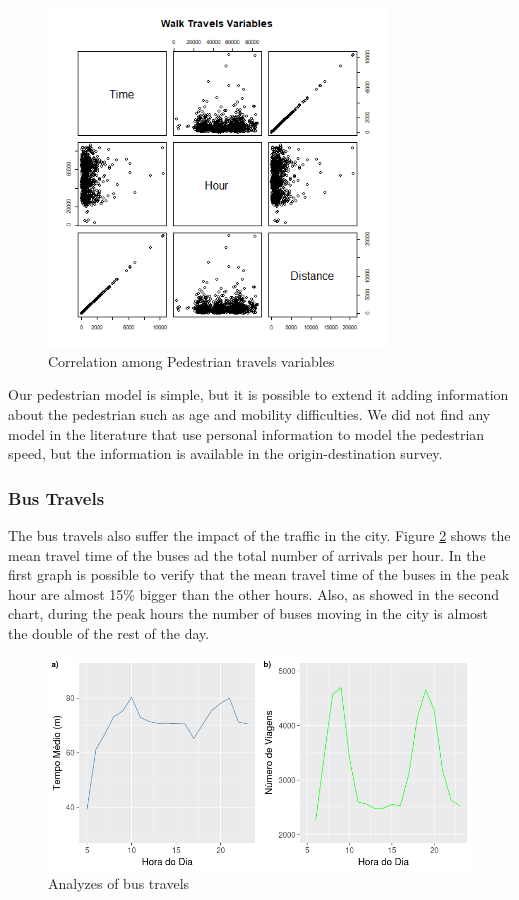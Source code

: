 \begin{figure}[!htb]
\centering
\includegraphics[width=0.8\textwidth]{figuras/chap-sp/scatter_walk.png}
\caption{Correlation among Pedestrian travels variables}
\label{fig:scatter_walk}
\end{figure}

Our pedestrian model is simple, but it is possible to extend it adding information about the pedestrian such as age and mobility difficulties. We did not find any model in the literature that use personal information to model the pedestrian speed, but the information is available in the origin-destination survey.

\subsubsection{Bus Travels}

The bus travels also suffer the impact of the traffic in the city. Figure \ref{fig:travel_time_bus} shows the mean travel time of the buses ad the total number of arrivals per hour.  In the first graph is possible to verify that the mean travel time of the buses in the peak hour are almost 15\% bigger than the other hours. Also, as showed in the second chart, during the peak hours the number of buses moving in the city is almost the double of the rest of the day.

\begin{figure}[!htb]
\centering
\includegraphics[width=1\textwidth]{figuras/chap-sp/time_distance_bus.png}
\caption{Analyzes of bus travels}
\label{fig:travel_time_bus}
\end{figure}

